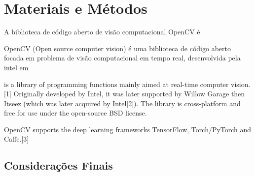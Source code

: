 \chapter{Materiais e Métodos}\label{cap:ferramentas}

A biblioteca de código aberto de visão computacional OpenCV \cite{itseez2015opencv} é 

OpenCV (Open source computer vision) \cite{itseez2015opencv} é uma biblioteca de código aberto focada em problema de visão computacional em tempo real, desenvolvida pela intel em 

is a library of programming functions mainly aimed at real-time computer vision.[1] Originally developed by Intel, it was later supported by Willow Garage then Itseez (which was later acquired by Intel[2]). The library is cross-platform and free for use under the open-source BSD license.

OpenCV supports the deep learning frameworks TensorFlow, Torch/PyTorch and Caffe.[3]



\section{Considerações Finais}

\lipsum[23]
